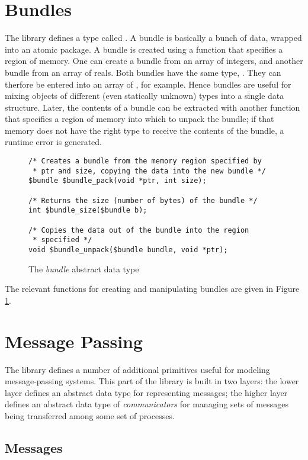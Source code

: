 \section{Bundles}

The library defines a type called \cbundle. A bundle is basically a
bunch of data, wrapped into an atomic package.  A bundle is created
using a function that specifies a region of memory.  One can create a
bundle from an array of integers, and another bundle from an array of
reals.  Both bundles have the same type, \cbundle.  They can therfore
be entered into an array of \cbundle, for example.  Hence bundles are
useful for mixing objects of different (even statically unknown) types
into a single data structure.  Later, the contents of a bundle can be
extracted with another function that specifies a region of memory into
which to unpack the bundle; if that memory does not have the right
type to receive the contents of the bundle, a runtime error is
generated.

\begin{figure}
\begin{verbatim}
/* Creates a bundle from the memory region specified by
 * ptr and size, copying the data into the new bundle */
$bundle $bundle_pack(void *ptr, int size);

/* Returns the size (number of bytes) of the bundle */
int $bundle_size($bundle b);

/* Copies the data out of the bundle into the region
 * specified */
void $bundle_unpack($bundle bundle, void *ptr);
\end{verbatim}
  \caption{The \emph{bundle} abstract data type}
  \label{fig:bundle}
\end{figure}

The relevant functions for creating and manipulating bundles
are given in Figure \ref{fig:bundle}.

\section{Message Passing}

The library defines a number of additional primitives useful for
modeling message-passing systems.  This part of the library is built
in two layers: the lower layer defines an abstract data type for
representing messages; the higher layer defines an abstract data type
of \emph{communicators} for managing sets of messages being
transferred among some set of processes.

\subsection{Messages}

